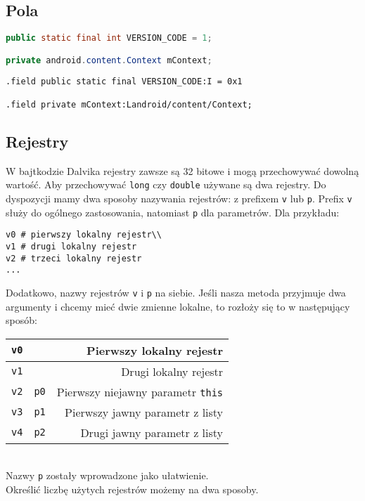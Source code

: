 \documentclass[12pt,a4paper,leqno,oneside,titlepage]{book}
\begin{document}
\subsection{Pola}
%
\begin{lstlisting}[language=Java,captionpos=b,caption={Java}]
public static final int VERSION_CODE = 1;

private android.content.Context mContext;
\end{lstlisting}
\begin{lstlisting}[language=smali,captionpos=b,caption={Smali}]
.field public static final VERSION_CODE:I = 0x1

.field private mContext:Landroid/content/Context;
\end{lstlisting}
%
\subsection{Rejestry}
%
W bajtkodzie Dalvika rejestry zawsze są 32 bitowe\cite{SmaliWiki} i mogą przechowywać dowolną wartość. Aby przechowywać \verb|long| czy \verb|double| używane są dwa rejestry.
Do dyspozycji mamy dwa sposoby nazywania rejestrów: z prefixem \verb|v| lub \verb|p|. Prefix \verb|v| służy do ogólnego zastosowania, natomiast \verb|p| dla parametrów.
Dla przykładu:
%
\begin{lstlisting}[language=smali,captionpos=b,caption={}]
v0 # pierwszy lokalny rejestr\\
v1 # drugi lokalny rejestr
v2 # trzeci lokalny rejestr
...
\end{lstlisting}
%
Dodatkowo, nazwy rejestrów \verb|v| i \verb|p|  na siebie.
Jeśli nasza metoda przyjmuje dwa argumenty i chcemy mieć dwie zmienne lokalne, to rozłoży się to w następujący sposób:\\
\begin{tabular}{|l | c | r |}
\hline 
\verb|v0| & & Pierwszy lokalny rejestr\\
\hline
\verb|v1| & & Drugi lokalny rejestr\\
\hline
\verb|v2| & \verb|p0| & Pierwszy niejawny parametr \verb|this|\\
\hline
\verb|v3| & \verb|p1| & Pierwszy jawny parametr z listy\\
\hline
\verb|v4| & \verb|p2| & Drugi jawny parametr z listy\\
\hline
\end{tabular} \\
%
Nazwy \verb|p| zostały wprowadzone jako ułatwienie.\\
Określić liczbę użytych rejestrów możemy na dwa sposoby. \\
\end{document}
